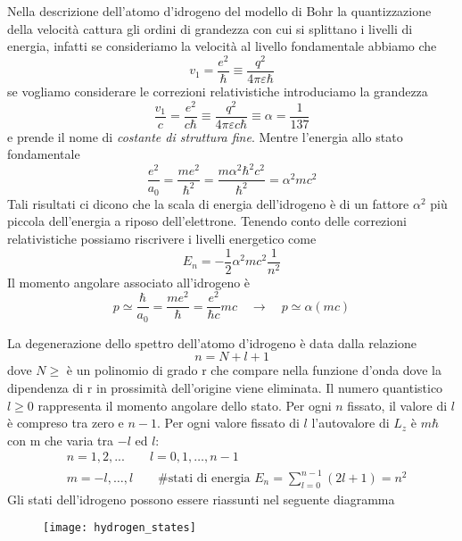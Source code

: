 Nella descrizione dell'atomo d'idrogeno del modello di Bohr la quantizzazione della velocit\`a cattura gli ordini di grandezza con cui si splittano i livelli di energia, infatti se consideriamo la velocit\`a al livello fondamentale abbiamo che 
\begin{equation*}
	v_1 = \frac{e^2}{\hbar } \equiv \frac{q^2}{4\pi \varepsilon \hbar}
\end{equation*}
se vogliamo considerare le correzioni relativistiche introduciamo la grandezza 
\begin{equation*}
	\frac{v_1}{c} = \frac{e^2}{c \hbar} \equiv \frac{q^2}{4 \pi \varepsilon c \hbar} \equiv \alpha = \frac{1}{137}
\end{equation*}
e prende il nome di \textit{costante di struttura fine}. Mentre l'energia allo stato fondamentale 
\begin{equation*}
	\frac{e^2}{a_0} = \frac{me^2}{\hbar^2} = \frac{m \alpha^2 \hbar^2 c^2}{\hbar^2} = \alpha^2 mc^2
\end{equation*}
Tali risultati ci dicono che la scala di energia dell'idrogeno \`e di un fattore $\alpha^2$ pi\`u piccola dell'energia a riposo dell'elettrone. Tenendo conto delle correzioni relativistiche possiamo riscrivere i livelli energetico come 
\begin{equation}
	E_n = - \frac{1}{2}\alpha^2 mc^2 \frac{1}{n^2}
\end{equation}
Il momento angolare associato all'idrogeno \`e 
\begin{equation*}
	p \simeq \frac{\hbar}{a_0} = \frac{me^2}{\hbar} = \frac{e^2}{\hbar c}mc \quad \rightarrow \quad p \simeq \alpha(mc)
\end{equation*}

La degenerazione dello spettro dell'atomo d'idrogeno \`e data dalla relazione
\begin{equation*}
	n = N+l+1
\end{equation*}
dove $N \geq $ \`e un polinomio di grado r che compare nella funzione d'onda dove la dipendenza di r in prossimit\`a dell'origine viene eliminata. Il numero quantistico $l \geq 0$ rappresenta il momento angolare dello stato. Per ogni $n$ fissato, il valore di $l$ \`e compreso tra zero e $n-1$. Per ogni valore fissato di $l$ l'autovalore di $L_z$ \`e $m \hbar$ con m che varia tra $-l$ ed $l$:
\begin{align*}
	& n = 1,2,... \quad \quad l = 0,1, \ldots, n-1 \\[0.5cm]
	& m = -l,\ldots,l \quad \quad \text{\# stati di energia } E_n = \sum_{l=0}^{n-1}(2l+1) = n^2
\end{align*}  
Gli stati dell'idrogeno possono essere riassunti nel seguente diagramma 
\begin{figure}[!ht]
\vspace{0.1in}
\texttt{[image: hydrogen\_states]}	
\centering
\vspace{0.1in}
\end{figure}

